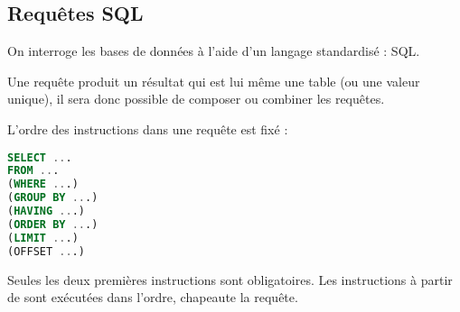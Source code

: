 \subsection{Requêtes SQL}
On interroge les bases de données à l'aide d'un langage standardisé : SQL.

Une requête produit un résultat qui est lui même une table (ou une valeur unique), il sera donc possible de composer ou combiner les requêtes.

L'ordre des instructions dans une requête est fixé :

\begin{lstlisting}[language=SQL]
SELECT ...
FROM ...
(WHERE ...)
(GROUP BY ...)
(HAVING ...)
(ORDER BY ...)
(LIMIT ...)
(OFFSET ...)
\end{lstlisting}

Seules les deux premières instructions sont obligatoires. Les instructions à partir de  sont exécutées dans l'ordre,  chapeaute la requête.

\newpage

